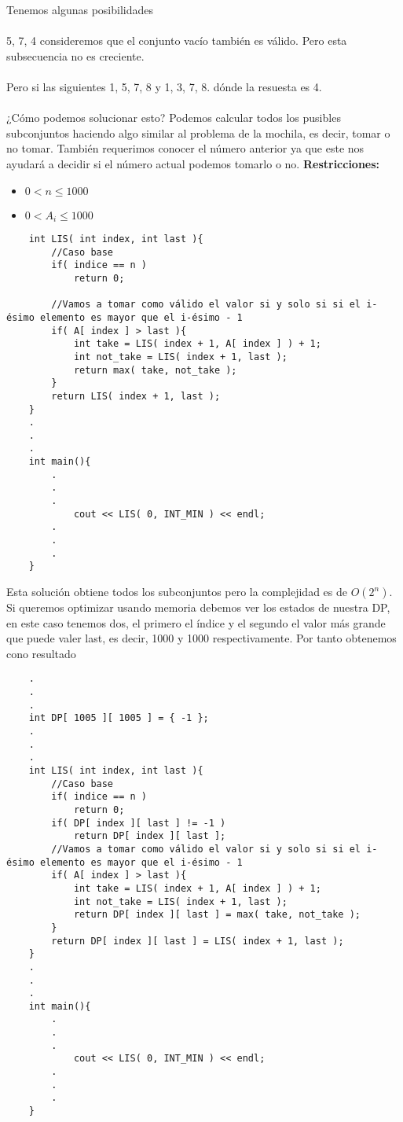 Tenemos algunas posibilidades\\\\

5, 7, 4 consideremos que el conjunto vacío también es válido. Pero esta subsecuencia no es creciente.\\\\ 

Pero si las siguientes 1, 5, 7, 8 y 1, 3, 7, 8. dónde la resuesta es 4.\\\\

¿Cómo podemos solucionar esto? Podemos calcular todos los pusibles subconjuntos haciendo algo similar al problema de la mochila, es decir, tomar o no tomar. También requerimos conocer el número anterior ya que este nos ayudará a decidir si el número actual podemos tomarlo o no.
\textbf{Restricciones: }
\begin{itemize}
    \item $0 < n \leq 1000$
    \item $0 < A_{i} \leq 1000$
\end{itemize}
\begin{lstlisting}
    int LIS( int index, int last ){
        //Caso base 
        if( indice == n )
            return 0;
        
        //Vamos a tomar como válido el valor si y solo si si el i-ésimo elemento es mayor que el i-ésimo - 1
        if( A[ index ] > last ){
            int take = LIS( index + 1, A[ index ] ) + 1;
            int not_take = LIS( index + 1, last );
            return max( take, not_take );
        }
        return LIS( index + 1, last );
    }
    .
    .
    .
    int main(){
        .
        .
        .
            cout << LIS( 0, INT_MIN ) << endl;
        .
        .
        .
    }
\end{lstlisting}

Esta solución obtiene todos los subconjuntos pero la complejidad es de $O(2^{n})$. Si queremos optimizar usando memoria debemos ver los estados de nuestra DP, en este caso tenemos dos, el primero el índice y el segundo el valor más grande que puede valer last, es decir, 1000 y 1000 respectivamente. Por tanto obtenemos cono resultado

\begin{lstlisting}
    .
    .
    .
    int DP[ 1005 ][ 1005 ] = { -1 };
    .
    .
    .
    int LIS( int index, int last ){
        //Caso base 
        if( indice == n )
            return 0;
        if( DP[ index ][ last ] != -1 )
            return DP[ index ][ last ];
        //Vamos a tomar como válido el valor si y solo si si el i-ésimo elemento es mayor que el i-ésimo - 1
        if( A[ index ] > last ){
            int take = LIS( index + 1, A[ index ] ) + 1;
            int not_take = LIS( index + 1, last );
            return DP[ index ][ last ] = max( take, not_take );
        }
        return DP[ index ][ last ] = LIS( index + 1, last );
    }
    .
    .
    .
    int main(){
        .
        .
        .
            cout << LIS( 0, INT_MIN ) << endl;
        .
        .
        .
    }
\end{lstlisting}

